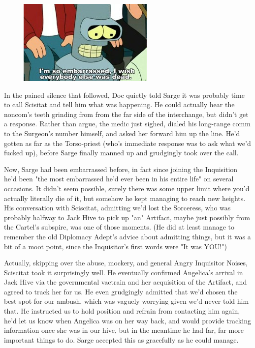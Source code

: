 \begin{figure}
	\begin{center}
		\includegraphics[width=\figwidth]{pics/19/36.png}
	\end{center}
\end{figure}
In the pained silence that followed, Doc quietly told Sarge it was probably time to call Scisitat and tell him what was happening. 
He could actually hear the noncom's teeth grinding from from the far side of the interchange, but didn't get a response. 
Rather than argue, the medic just sighed, dialed his long-range comm to the Surgeon's number himself, and asked her forward him up the line. 
He'd gotten as far as the Torso-priest (who's immediate response was to ask what we'd fucked up), before Sarge finally manned up and grudgingly took over the call.

Now, Sarge had been embarrassed before, in fact since joining the Inquisition he'd been "the most embarrassed he'd ever been in his entire life" on several occasions. 
It didn't seem possible, surely there was some upper limit where you'd actually literally die of it, but somehow he kept managing to reach new heights. 
His conversation with Sciscitat, admitting we'd lost the Sorceress, who was probably halfway to Jack Hive to pick up "an" Artifact, maybe just possibly from the Cartel's subspire, was one of those moments. 
(He did at least manage to remember the old Diplomacy Adept's advice about admitting things, but it was a bit of a moot point, since the Inquisitor's first words were "It was YOU!")

Actually, skipping over the abuse, mockery, and general Angry Inquisitor Noises, Sciscitat took it surprisingly well. 
He eventually confirmed Angelica's arrival in Jack Hive via the governmental vactrain and her acquisition of the Artifact, and agreed to track her for us. 
He even grudgingly admitted that we'd chosen the best spot for our ambush, which was vaguely worrying given we'd never told him that. 
He instructed us to hold position and refrain from contacting him again, he'd let us know when Angelica was on her way back, and would provide tracking information once she was in our hive, but in the meantime he had far, far more important things to do. 
Sarge accepted this as gracefully as he could manage.

